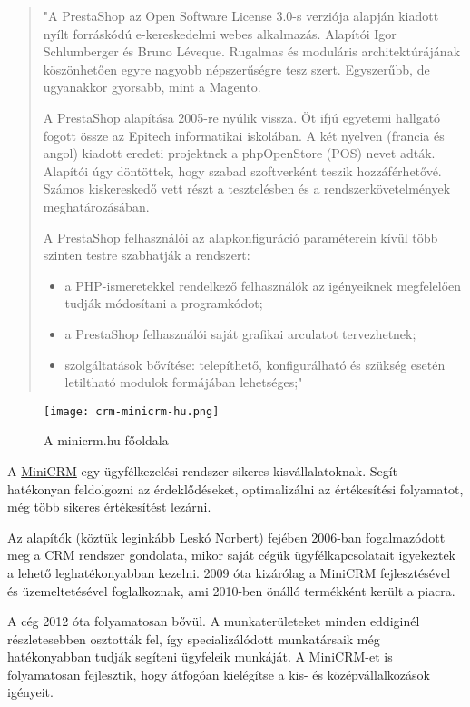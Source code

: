 \begin{quote}
	"A PrestaShop az Open Software License 3.0-s verziója alapján kiadott nyílt forráskódú e-kereskedelmi webes alkalmazás. Alapítói Igor Schlumberger és Bruno Léveque. Rugalmas és moduláris architektúrájának köszönhetően egyre nagyobb népszerűségre tesz szert. Egyszerűbb, de ugyanakkor gyorsabb, mint a Magento.

	A PrestaShop alapítása 2005-re nyúlik vissza. Öt ifjú egyetemi hallgató fogott össze az Epitech informatikai iskolában. A két nyelven (francia és angol) kiadott eredeti projektnek a phpOpenStore (POS) nevet adták. Alapítói úgy döntöttek, hogy szabad szoftverként teszik hozzáférhetővé. Számos kiskereskedő vett részt a tesztelésben és a rendszerkövetelmények meghatározásában.

	A PrestaShop felhasználói az alapkonfiguráció paraméterein kívül több szinten testre szabhatják a rendszert:
	\begin{itemize}
		\item a PHP-ismeretekkel rendelkező felhasználók az igényeiknek megfelelően tudják módosítani a programkódot;
		\item a PrestaShop felhasználói saját grafikai arculatot tervezhetnek;
		\item szolgáltatások bővítése: telepíthető, konfigurálható és szükség esetén letiltható modulok formájában lehetséges;"
	\end{itemize}
\end{quote}

\newpage

\begin{figure}
	\texttt{[image: crm-minicrm-hu.png]}
	\caption{A minicrm.hu főoldala}
\end{figure}


A \href{http://www.minicrm.hu/}{MiniCRM} egy ügyfélkezelési rendszer sikeres kisvállalatoknak. Segít hatékonyan feldolgozni az érdeklődéseket, optimalizálni az értékesítési folyamatot, még több sikeres értékesítést lezárni.

Az alapítók (köztük leginkább Leskó Norbert) fejében 2006-ban fogalmazódott meg a CRM rendszer gondolata, mikor saját cégük ügyfélkapcsolatait igyekeztek a lehető leghatékonyabban kezelni. 2009 óta kizárólag a MiniCRM fejlesztésével és üzemeltetésével foglalkoznak, ami 2010-ben önálló termékként került a piacra.

A cég 2012 óta folyamatosan bővül. A munkaterületeket minden eddiginél részletesebben osztották fel, így specializálódott munkatársaik még hatékonyabban tudják segíteni ügyfeleik munkáját. A MiniCRM-et is folyamatosan fejlesztik, hogy átfogóan kielégítse a kis- és középvállalkozások igényeit.

